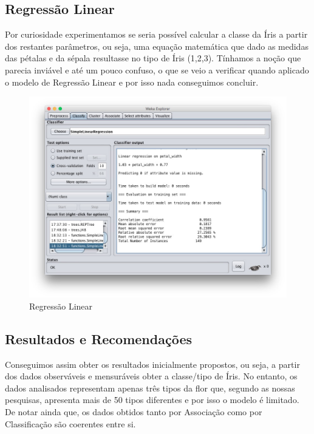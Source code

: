 \subsection{Regressão Linear}

Por curiosidade experimentamos se seria possível calcular a classe da Íris a partir dos restantes parâmetros, ou seja, uma equação matemática que dado as medidas das pétalas e da sépala resultasse no tipo de Íris (1,2,3). Tínhamos a noção que parecia inviável e até um pouco confuso, o que se veio a verificar quando aplicado o modelo de Regressão Linear e por isso nada conseguimos concluir.


\begin{figure}[H]
    \centering
    \includegraphics[scale=0.3]{tex/img/img6i.jpg}
    \caption{Regressão Linear}
    \label{fig:rl}
\end{figure}

\subsection{Resultados e Recomendações}

Conseguimos assim obter os resultados inicialmente propostos, ou seja, a partir dos dados observáveis e mensuráveis obter a classe/tipo de Íris. No entanto, os dados analisados representam apenas três tipos da flor que, segundo as nossas pesquisas, apresenta mais de 50 tipos diferentes e por isso o modelo é limitado.
De notar ainda que, os dados obtidos tanto por Associação como por Classificação são coerentes entre si.